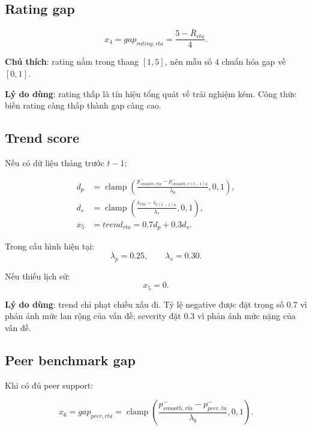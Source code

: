 \documentclass[12pt,a4paper]{article}
\begin{document}
\subsection{Rating gap}

\begin{equation}
x_4 = gap_{rating,rta}
= \frac{5-\bar{R}_{rta}}{4}.
\end{equation}

\textbf{Chú thích}: rating nằm trong thang $[1,5]$, nên mẫu số $4$ chuẩn hóa gap về $[0,1]$.

\textbf{Lý do dùng}: rating thấp là tín hiệu tổng quát về trải nghiệm kém. Công thức biến rating càng thấp thành gap càng cao.

\subsection{Trend score}

Nếu có dữ liệu tháng trước $t-1$:

\begin{align}
d_p &= \operatorname{clamp}\left(\frac{p^{-}_{smooth,rta}-p^{-}_{smooth,r(t-1)a}}{\lambda_p},0,1\right),\\
d_s &= \operatorname{clamp}\left(\frac{\bar{s}_{rta}-\bar{s}_{r(t-1)a}}{\lambda_s},0,1\right),\\
x_5 &= trend_{rta}=0.7d_p+0.3d_s.
\end{align}

Trong cấu hình hiện tại:
\begin{equation}
\lambda_p=0.25,\qquad \lambda_s=0.30.
\end{equation}

Nếu thiếu lịch sử:
\begin{equation}
x_5=0.
\end{equation}

\textbf{Lý do dùng}: trend chỉ phạt chiều xấu đi. Tỷ lệ negative được đặt trọng số $0.7$ vì phản ánh mức lan rộng của vấn đề; severity đặt $0.3$ vì phản ánh mức nặng của vấn đề.

\subsection{Peer benchmark gap}

Khi có đủ peer support:

\begin{equation}
x_6 = gap_{peer,rta}
= \operatorname{clamp}\left(
\frac{p^{-}_{smooth,rta}-p^{-}_{peer,ta}}{\lambda_b},0,1
\right).
\end{equation}
\end{document}
